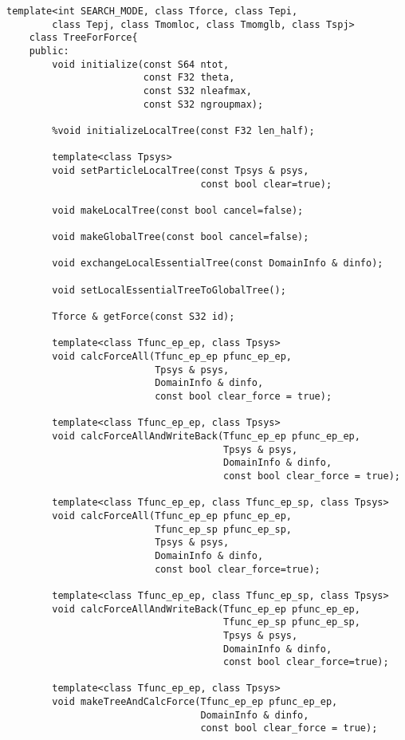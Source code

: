 \begin{lstlisting}[caption=相互作用クラス]
    template<int SEARCH_MODE, class Tforce, class Tepi,
        class Tepj, class Tmomloc, class Tmomglb, class Tspj>
    class TreeForForce{
    public:
        void initialize(const S64 ntot,
                        const F32 theta,
                        const S32 nleafmax,
                        const S32 ngroupmax);

        %void initializeLocalTree(const F32 len_half);

        template<class Tpsys>
        void setParticleLocalTree(const Tpsys & psys,
                                  const bool clear=true);

        void makeLocalTree(const bool cancel=false);

        void makeGlobalTree(const bool cancel=false);

        void exchangeLocalEssentialTree(const DomainInfo & dinfo);

        void setLocalEssentialTreeToGlobalTree();

        Tforce & getForce(const S32 id);

        template<class Tfunc_ep_ep, class Tpsys>
        void calcForceAll(Tfunc_ep_ep pfunc_ep_ep, 
                          Tpsys & psys,
                          DomainInfo & dinfo,
                          const bool clear_force = true);

        template<class Tfunc_ep_ep, class Tpsys>
        void calcForceAllAndWriteBack(Tfunc_ep_ep pfunc_ep_ep, 
                                      Tpsys & psys,
                                      DomainInfo & dinfo,
                                      const bool clear_force = true);

        template<class Tfunc_ep_ep, class Tfunc_ep_sp, class Tpsys>
        void calcForceAll(Tfunc_ep_ep pfunc_ep_ep, 
                          Tfunc_ep_sp pfunc_ep_sp,  
                          Tpsys & psys,
                          DomainInfo & dinfo,
                          const bool clear_force=true);

        template<class Tfunc_ep_ep, class Tfunc_ep_sp, class Tpsys>
        void calcForceAllAndWriteBack(Tfunc_ep_ep pfunc_ep_ep, 
                                      Tfunc_ep_sp pfunc_ep_sp,  
                                      Tpsys & psys,
                                      DomainInfo & dinfo,
                                      const bool clear_force=true);

        template<class Tfunc_ep_ep, class Tpsys>
        void makeTreeAndCalcForce(Tfunc_ep_ep pfunc_ep_ep, 
                                  DomainInfo & dinfo,
                                  const bool clear_force = true);


\end{lstlisting}
